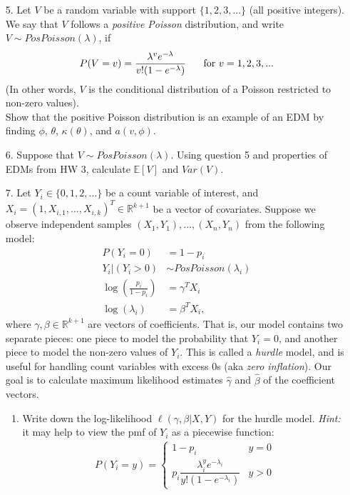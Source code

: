 \documentclass[11pt]{article}
\begin{document}
\begin{enumerate}
\item[5.] Let $V$ be a random variable with support $\{1, 2, 3, ... \}$ (all positive integers). We say that $V$ follows a \textit{positive Poisson} distribution, and write $V \sim PosPoisson(\lambda)$, if
$$P(V = v) = \frac{\lambda^v e^{-\lambda}}{v! (1 - e^{-\lambda})} \hspace{0.5cm} \text{ for } v = 1, 2, 3, ...$$
(In other words, $V$ is the conditional distribution of a Poisson restricted to non-zero values).\\

\noindent Show that the positive Poisson distribution is an example of an EDM by finding $\phi$, $\theta$, $\kappa(\theta)$, and $a(v, \phi)$.\\

\vspace{1cm}

\item[6.] Suppose that $V \sim PosPoisson(\lambda)$. Using question 5 and properties of EDMs from HW 3, calculate $\mathbb{E}[V]$ and $Var(V)$.\\

\vspace{1cm}

\item[7.] Let $Y_i \in \{0, 1, 2, ...\}$ be a count variable of interest, and $X_i = (1, X_{i,1},...,X_{i,k})^T \in \mathbb{R}^{k+1}$ be a vector of covariates. Suppose we observe independent samples $(X_1, Y_1),...,(X_n, Y_n)$ from the following model:
\begin{align*}
P(Y_i = 0) &= 1 - p_i \\
Y_i | (Y_i > 0) &\sim PosPoisson(\lambda_i)\\
\log \left( \frac{p_i}{1-p_i} \right) &= \gamma^T X_i \\
\log(\lambda_i) &= \beta^T X_i,
\end{align*}
where $\gamma, \beta \in \mathbb{R}^{k+1}$ are vectors of coefficients. That is, our model contains two separate pieces: one piece to model the probability that $Y_i = 0$, and another piece to model the non-zero values of $Y_i$. This is called a \textit{hurdle} model, and is useful for handling count variables with excess 0s (aka \textit{zero inflation}). Our goal is to calculate maximum likelihood estimates $\widehat{\gamma}$ and $\widehat{\beta}$ of the coefficient vectors.

\begin{enumerate}
\item Write down the log-likelihood $\ell(\gamma, \beta | X, Y)$ for the hurdle model. \textit{Hint:} it may help to view the pmf of $Y_i$ as a piecewise function:
\begin{align*}
P(Y_i = y) = \begin{cases}
1 - p_i & y = 0 \\
p_i \dfrac{\lambda_i^y e^{-\lambda_i}}{y! (1 - e^{-\lambda_i})} & y > 0
\end{cases}
\end{align*}


\end{enumerate}
\end{enumerate}
\end{document}
